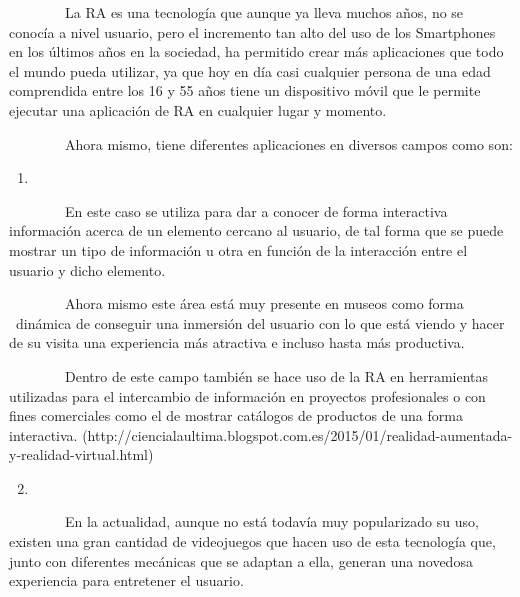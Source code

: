 \documentclass[]{article}
\begin{document}
~~~~~~~~La RA es una tecnología que aunque ya lleva muchos años, no se
conocía a nivel usuario, pero el incremento tan alto del uso de los
Smartphones en los últimos años en la sociedad, ha permitido crear más
aplicaciones que todo el mundo pueda utilizar, ya que hoy en día casi
cualquier persona de una edad comprendida entre los 16 y 55 años tiene
un dispositivo móvil que le permite ejecutar una aplicación de RA en
cualquier lugar y momento.

~~~~~~~~Ahora mismo, tiene diferentes aplicaciones en diversos campos
como son:

\begin{enumerate}
\item
\end{enumerate}

~~~~~~~~En este caso se utiliza para dar a conocer de forma interactiva
información acerca de un elemento cercano al usuario, de tal forma que
se puede mostrar un tipo de información u otra en función de la
interacción entre el usuario y dicho elemento.

~~~~~~~~Ahora mismo este área está muy presente en museos como forma
~dinámica de conseguir una inmersión del usuario con lo que está viendo
y hacer de su visita una experiencia más atractiva e incluso hasta más
productiva.

~~~~~~~~Dentro de este campo también se hace uso de la RA en
herramientas utilizadas para el intercambio de información en proyectos
profesionales o con fines comerciales como el de mostrar catálogos de
productos de una forma interactiva.
(http://ciencialaultima.blogspot.com.es/2015/01/realidad-aumentada-y-realidad-virtual.html)

\begin{enumerate}
\setcounter{enumi}{1}
\item
\end{enumerate}

~~~~~~~~En la actualidad, aunque no está todavía muy popularizado su
uso, existen una gran cantidad de videojuegos que hacen uso de esta
tecnología que, junto con diferentes mecánicas que se adaptan a ella,
generan una novedosa experiencia para entretener el usuario.
\end{document}
